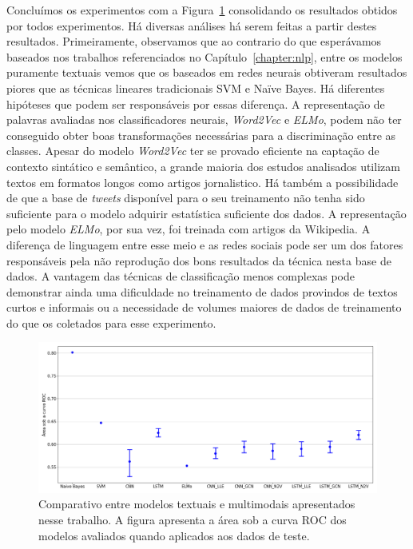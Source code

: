 Concluímos os experimentos com a Figura~\ref{fig:experiment_results}
consolidando os resultados obtidos por todos experimentos.
Há diversas análises há serem feitas a partir destes resultados.
Primeiramente, observamos que ao contrario do que esperávamos baseados nos
trabalhos referenciados no Capítulo~\ref{chapter:nlp}, entre os modelos
puramente textuais vemos que os baseados em redes neurais obtiveram resultados
piores que as técnicas lineares tradicionais SVM e Naïve Bayes.
Há diferentes hipóteses que podem ser responsáveis por essas diferença.
A representação de palavras avaliadas nos classificadores neurais,
\textit{Word2Vec} e \textit{ELMo}, podem não ter conseguido obter boas
transformações necessárias para a discriminação entre as classes.
Apesar do modelo \textit{Word2Vec} ter se provado eficiente na captação de
contexto sintático e semântico, a grande maioria dos estudos analisados utilizam
textos em formatos longos como artigos jornalistico.
Há também a possibilidade de que a base de \textit{tweets} disponível para o seu
treinamento não tenha sido suficiente para o modelo adquirir estatística
suficiente dos dados.
A representação pelo modelo \textit{ELMo}, por sua vez, foi treinada com artigos
da Wikipedia.
A diferença de linguagem entre esse meio e as redes sociais pode ser um dos
fatores responsáveis pela não reprodução dos bons resultados da técnica nesta
base de dados.
A vantagem das técnicas de classificação menos complexas pode demonstrar ainda
uma dificuldade no treinamento de dados provindos de textos curtos e informais
ou a necessidade de volumes maiores de dados de treinamento do que os coletados
para esse experimento.

\begin{figure}[h]
\begin{center} {
    \begin{center}
    \includegraphics[scale=0.35]{images/experiment_results.png}
    \caption{Comparativo entre modelos textuais e multimodais apresentados nesse
             trabalho. A figura apresenta a área sob a curva ROC dos modelos
             avaliados quando aplicados aos dados de teste.}
    \label{fig:experiment_results}
    \end{center}
}
\end{center}
\end{figure}

